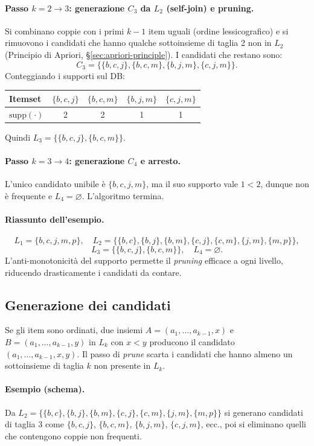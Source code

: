 \paragraph{Passo $k=2\to3$: generazione $C_3$ da $L_2$ (self-join) e pruning.}
Si combinano coppie con i primi $k-1$ item uguali (ordine lessicografico) e si rimuovono i candidati che hanno qualche sottoinsieme di taglia 2 non in $L_2$ (Principio di Apriori, \S\ref{sec:apriori-principle}). I candidati che restano sono:
\[
C_3=\{\{b,c,j\},\{b,c,m\},\{b,j,m\},\{c,j,m\}\}.
\]
Conteggiando i supporti sul DB:
\begin{center}
\begin{tabular}{@{}lcccc@{}}
\toprule
Itemset & $\{b,c,j\}$ & $\{b,c,m\}$ & $\{b,j,m\}$ & $\{c,j,m\}$ \\
\midrule
$\mathrm{supp}(\cdot)$ & 2 & 2 & 1 & 1 \\
\bottomrule
\end{tabular}
\end{center}
Quindi $L_3=\{\{b,c,j\},\{b,c,m\}\}$.

\paragraph{Passo $k=3\to4$: generazione $C_4$ e arresto.}
L’unico candidato unibile è $\{b,c,j,m\}$, ma il suo supporto vale $1<2$, dunque non è frequente e $L_4=\varnothing$. L’algoritmo termina.

\paragraph{Riassunto dell’esempio.}
\[
L_1=\{b,c,j,m,p\},\quad
L_2=\{\{b,c\},\{b,j\},\{b,m\},\{c,j\},\{c,m\},\{j,m\},\{m,p\}\},
\]
\[
L_3=\{\{b,c,j\},\{b,c,m\}\},\quad
L_4=\varnothing.
\]
L’anti-monotonicità del supporto permette il \emph{pruning} efficace a ogni livello, riducendo drasticamente i candidati da contare. 


\subsection{Generazione dei candidati}\label{subsec:candidate-gen}
Se gli item sono ordinati, due insiemi $A=(a_1,\dots,a_{k-1},x)$ e $B=(a_1,\dots,a_{k-1},y)$ in $L_k$ con $x<y$ producono il candidato $(a_1,\dots,a_{k-1},x,y)$. Il passo di \emph{prune} scarta i candidati che hanno almeno un sottoinsieme di taglia $k$ non presente in $L_k$.

\paragraph{Esempio (schema).} Da $L_2=\{\{b,c\},\{b,j\},\{b,m\},\{c,j\},\{c,m\},\{j,m\},\{m,p\}\}$ si generano candidati di taglia 3 come $\{b,c,j\}$, $\{b,c,m\}$, $\{b,j,m\}$, $\{c,j,m\}$, ecc., poi si eliminano quelli che contengono coppie non frequenti.

